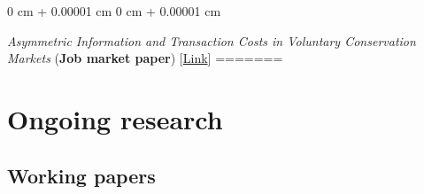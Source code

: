\documentclass[12pt]{article}
\newenvironment{onecolentry}{
	\begin{adjustwidth}{
			0 cm + 0.00001 cm
		}{
			0 cm + 0.00001 cm
		}
	}
	{
	\end{adjustwidth}
} %
\newenvironment{paper}{
	\begin{onecolentry}
	\begin{hangingpar}
}{
	\end{hangingpar}
	\end{onecolentry}
	\smallskip
} %
\begin{document}
\begin{paper}
	\emph{Asymmetric Information and Transaction Costs in Voluntary Conservation Markets} (\textbf{Job market paper}) \hfill [\href{https://wmrobin.github.io/research/papers/robinson-jmp.pdf}{Link}]
=======
\section{Ongoing research}


\subsection{Working papers}

\vspace{0.1cm}


\end{paper}
\end{document}
